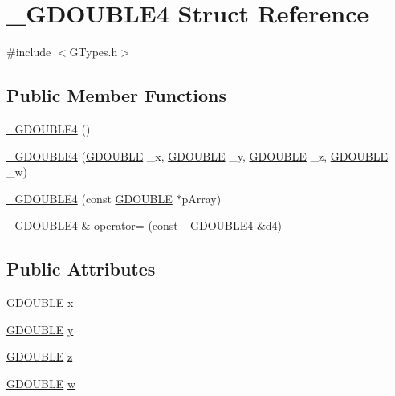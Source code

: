 \hypertarget{struct___g_d_o_u_b_l_e4}{}\section{\+\_\+\+G\+D\+O\+U\+B\+L\+E4 Struct Reference}
\label{struct___g_d_o_u_b_l_e4}


{\ttfamily \#include $<$G\+Types.\+h$>$}

\subsection*{Public Member Functions}
\begin{DoxyCompactItemize}
\item 
\hyperlink{struct___g_d_o_u_b_l_e4_a1c129cc56dcae65b8614629eacc0a846}{\+\_\+\+G\+D\+O\+U\+B\+L\+E4} ()
\item 
\hyperlink{struct___g_d_o_u_b_l_e4_a651f749befd367e33628e99a723b16c4}{\+\_\+\+G\+D\+O\+U\+B\+L\+E4} (\hyperlink{_g_types_8h_afd05ac85f90ee8e2a733928545462cd4}{G\+D\+O\+U\+B\+L\+E} \+\_\+x, \hyperlink{_g_types_8h_afd05ac85f90ee8e2a733928545462cd4}{G\+D\+O\+U\+B\+L\+E} \+\_\+y, \hyperlink{_g_types_8h_afd05ac85f90ee8e2a733928545462cd4}{G\+D\+O\+U\+B\+L\+E} \+\_\+z, \hyperlink{_g_types_8h_afd05ac85f90ee8e2a733928545462cd4}{G\+D\+O\+U\+B\+L\+E} \+\_\+w)
\item 
\hyperlink{struct___g_d_o_u_b_l_e4_ad0f85dd0382ca80478ff1808d10599ce}{\+\_\+\+G\+D\+O\+U\+B\+L\+E4} (const \hyperlink{_g_types_8h_afd05ac85f90ee8e2a733928545462cd4}{G\+D\+O\+U\+B\+L\+E} $\ast$p\+Array)
\item 
\hyperlink{struct___g_d_o_u_b_l_e4}{\+\_\+\+G\+D\+O\+U\+B\+L\+E4} \& \hyperlink{struct___g_d_o_u_b_l_e4_a7f634d4a552564354d45390b9f8d1493}{operator=} (const \hyperlink{struct___g_d_o_u_b_l_e4}{\+\_\+\+G\+D\+O\+U\+B\+L\+E4} \&d4)
\end{DoxyCompactItemize}
\subsection*{Public Attributes}
\begin{DoxyCompactItemize}
\item 
\hyperlink{_g_types_8h_afd05ac85f90ee8e2a733928545462cd4}{G\+D\+O\+U\+B\+L\+E} \hyperlink{struct___g_d_o_u_b_l_e4_a9497562bf12fc4ee54fe01447006e0b9}{x}
\item 
\hyperlink{_g_types_8h_afd05ac85f90ee8e2a733928545462cd4}{G\+D\+O\+U\+B\+L\+E} \hyperlink{struct___g_d_o_u_b_l_e4_a58d464e8d8f28c6cbb76fcb948bd15cb}{y}
\item 
\hyperlink{_g_types_8h_afd05ac85f90ee8e2a733928545462cd4}{G\+D\+O\+U\+B\+L\+E} \hyperlink{struct___g_d_o_u_b_l_e4_a31b0f16ba56fa8ca0a97727d88d8cf61}{z}
\item 
\hyperlink{_g_types_8h_afd05ac85f90ee8e2a733928545462cd4}{G\+D\+O\+U\+B\+L\+E} \hyperlink{struct___g_d_o_u_b_l_e4_a3ab56a877250222e47546a58bc539d9d}{w}
\end{DoxyCompactItemize}


